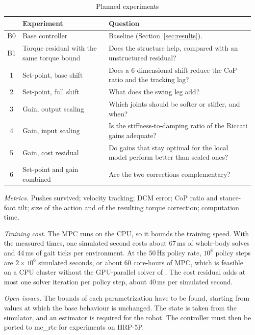 \documentclass[conference]{IEEEtran}
\begin{document}
\begin{table}[t]
\caption{Planned experiments}
\label{tab:exp}
\centering
\setlength{\tabcolsep}{3pt}
\begin{tabular}{@{}cp{}p{}@{}}
\toprule
 & Experiment & Question\\
\midrule
B0 & Base controller & Baseline (Section~\ref{sec:results}).\\
B1 & Torque residual with the same torque bound & Does the structure help, compared with an unstructured residual?\\
1 & Set-point, base shift & Does a 6-dimensional shift reduce the CoP ratio and the tracking lag?\\
2 & Set-point, full shift & What does the swing leg add?\\
3 & Gain, output scaling & Which joints should be softer or stiffer, and when?\\
4 & Gain, input scaling & Is the stiffness-to-damping ratio of the Riccati gains adequate?\\
5 & Gain, cost residual & Do gains that stay optimal for the local model perform better than scaled ones?\\
6 & Set-point and gain combined & Are the two corrections complementary?\\
\bottomrule
\end{tabular}
\end{table}

\emph{Metrics.} Pushes survived; velocity tracking; DCM error; CoP ratio and stance-foot tilt; size of the action and of the resulting torque correction; computation time.

\emph{Training cost.} The MPC runs on the CPU, so it bounds the training speed.
With the measured times, one simulated second costs about 67\,ms of whole-body solves and 44\,ms of gait ticks per environment.
At the 50\,Hz policy rate, $10^8$ policy steps are $2\times10^6$ simulated seconds, or about 60 core-hours of MPC, which is feasible on a CPU cluster without the GPU-parallel solver of \cite{jeon2025residualmpc}.
The cost residual adds at most one solver iteration per policy step, about 40\,ms per simulated second.

\emph{Open issues.} The bounds of each parametrization have to be found, starting from values at which the base behaviour is unchanged.
The state is taken from the simulator, and an estimator is required for the robot.
The controller must then be ported to mc\_rtc for experiments on HRP-5P.
\end{document}
